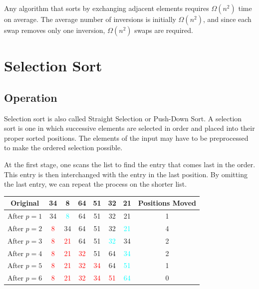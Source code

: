 Any algorithm that sorts by exchanging adjacent elements requires \( \Omega(n^2) \) time on average. The average number of inversions is initially \( \Omega(n^2) \), and since each swap removes only one inversion, \( \Omega(n^2) \) swaps are required.

\section{Selection Sort}
\subsection{Operation}
Selection sort is also called Straight Selection or Push-Down Sort. A selection sort is one in which successive elements are selected in order and placed into their proper sorted positions. The elements of the input may have to be preprocessed to make the ordered selection possible. 

At the first stage, one scans the list to find the entry that comes last in the order. This entry is then interchanged with the entry in the last position. By omitting the last entry, we can repeat the process on the shorter list.

\begin{table}[H]
  \centering
  \begin{tabular}{c|c c c c c c|c}
    \toprule
    Original & 34 & 8 & 64 & 51 & 32 & 21 & Positions Moved  \\
    \midrule
    After \(p = 1\) & 34 & \textcolor{cyan}{8} & 64 & 51 & 32 & 21 & 1  \\
    \midrule
    After \(p = 2\) & \textcolor{red}{8} & 34 & 64 & 51 & 32 & \textcolor{cyan}{21} & 4  \\
    \midrule
    After \(p = 3\) & \textcolor{red}{8} & \textcolor{red}{21} & 64 & 51 & \textcolor{cyan}{32} & 34 & 2  \\
    \midrule
    After \(p = 4\) & \textcolor{red}{8} & \textcolor{red}{21} & \textcolor{red}{32} & 51 & 64 & \textcolor{cyan}{34} & 2  \\
    \midrule
    After \(p = 5\) & \textcolor{red}{8} & \textcolor{red}{21} & \textcolor{red}{32} & \textcolor{red}{34} & 64 & \textcolor{cyan}{51} & 1 \\
    \midrule
    After \(p = 6\) & \textcolor{red}{8} & \textcolor{red}{21} & \textcolor{red}{32} & \textcolor{red}{34} & \textcolor{red}{51} & \textcolor{cyan}{64} & 0 \\
    \bottomrule
  \end{tabular}
\end{table}

